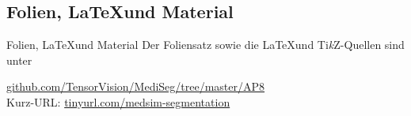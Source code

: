 \subsection{Folien, \LaTeX und Material}
\begin{frame}{Folien, \LaTeX und Material}
Der Foliensatz sowie die \LaTeX und Ti\textit{k}Z-Quellen sind unter

\href{https://github.com/TensorVision/MediSeg/tree/master/AP8}{github.com/TensorVision/MediSeg/tree/master/AP8}
\\

Kurz-URL:
\href{http://tinyurl.com/medsim-segmentation}{tinyurl.com/medsim-segmentation}
\end{frame}
